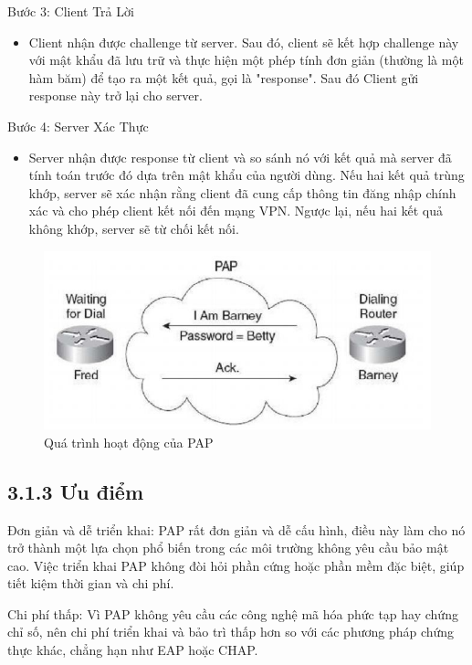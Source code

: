 Bước 3: Client Trả Lời
\begin{itemize}[left=1.5cm]
        \item Client nhận được challenge từ server. Sau đó, client sẽ kết hợp challenge này với mật khẩu đã lưu trữ và thực hiện một phép tính đơn giản (thường là một hàm băm) để tạo ra một kết quả, gọi là "response". Sau đó Client gửi response này trở lại cho server.
    \end{itemize}

Bước 4: Server Xác Thực
    \begin{itemize}[left=1.5cm]
        \item Server nhận được response từ client và so sánh nó với kết quả mà server đã tính toán trước đó dựa trên mật khẩu của người dùng. Nếu hai kết quả trùng khớp, server sẽ xác nhận rằng client đã cung cấp thông tin đăng nhập chính xác và cho phép client kết nối đến mạng VPN. Ngược lại, nếu hai kết quả không khớp, server sẽ từ chối kết nối.
    \end{itemize}

    \begin{figure}[htbp]
        \centering
        \includegraphics[width=0.7\linewidth]{img/pap.jpeg}
        \caption{Quá trình hoạt động của PAP}
        \end{figure}

 \subsection*{3.1.3 Ưu điểm}

 Đơn giản và dễ triển khai: PAP rất đơn giản và dễ cấu hình, điều này làm cho nó trở thành một lựa chọn phổ biến trong các môi trường không yêu cầu bảo mật cao. Việc triển khai PAP không đòi hỏi phần cứng hoặc phần mềm đặc biệt, giúp tiết kiệm thời gian và chi phí.

Chi phí thấp: Vì PAP không yêu cầu các công nghệ mã hóa phức tạp hay chứng chỉ số, nên chi phí triển khai và bảo trì thấp hơn so với các phương pháp chứng thực khác, chẳng hạn như EAP hoặc CHAP.

